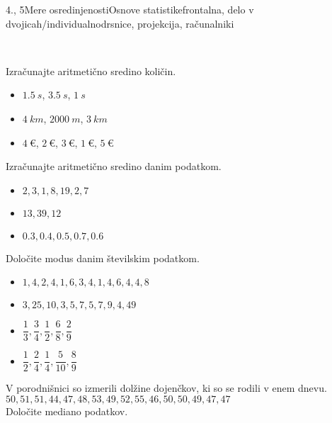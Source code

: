 \begin{priprava}{4., 5}{}{Mere osredinjenosti}{Osnove statistike}{frontalna, delo v dvojicah/individualno}{drsnice, projekcija, računalniki}
\begin{figure}[H]
        \end{figure}
    

        ~




    \begin{naloga}
        Izračunajte aritmetično sredino količin.
        \begin{itemize}
            \item $1.5~s$, $3.5~s$, $1~s$
            \item $4~km$, $2000~m$, $3~km$
            \item $4~€$, $2~€$, $3~€$, $1~€$, $5~€$
        \end{itemize}
    \end{naloga}

    \begin{naloga}
        Izračunajte aritmetično sredino danim podatkom.
        \begin{itemize}
            \item $2, 3, 1, 8, 19, 2, 7$
            \item $13, 39, 12$
            \item $0.3, 0.4, 0.5, 0.7, 0.6$
        \end{itemize}            \end{naloga}



    \begin{naloga}
        Določite modus danim številskim podatkom.
        \begin{itemize}
            \item $1, 4, 2, 4, 1, 6, 3, 4, 1, 4, 6, 4, 4, 8$
            \item $3, 25, 10, 3, 5, 7, 5, 7, 9, 4, 49$
            \item $\dfrac{1}{3}, \dfrac{3}{4}, \dfrac{1}{2}, \dfrac{6}{8}, \dfrac{2}{9}$
            \item $\dfrac{1}{2}, \dfrac{2}{4}, \dfrac{1}{4}, \dfrac{5}{10}, \dfrac{8}{9}$
        \end{itemize}
    \end{naloga}

    \begin{naloga}
        V porodnišnici so izmerili dolžine dojenčkov, ki so se rodili v enem dnevu.  \\
        $50, 51, 51, 44, 47, 48, 53, 49, 52, 55, 46, 50, 50, 49, 47, 47$ \\
        Določite mediano podatkov.
    \end{naloga}






\end{priprava}
